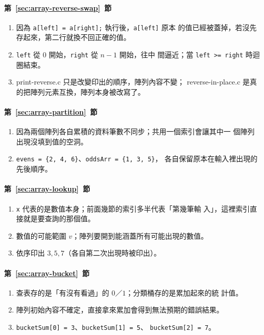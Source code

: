 \paragraph{第~\ref{sec:array-reverse-swap}~節}
\begin{enumerate}
\item 因為 \texttt{a[left] = a[right];} 執行後，\texttt{a[left]} 原本
的值已經被蓋掉，若沒先存起來，第二行就換不回正確的值。
\item \texttt{left} 從 $0$ 開始，\texttt{right} 從 $n - 1$ 開始，往中
間逼近；當 \texttt{left >= right} 時迴圈結束。
\item print-reverse.c 只是改變印出的順序，陣列內容不變；
reverse-in-place.c 是真的把陣列元素互換，陣列本身被改寫了。
\end{enumerate}

\paragraph{第~\ref{sec:array-partition}~節}
\begin{enumerate}
\item 因為兩個陣列各自累積的資料筆數不同步；共用一個索引會讓其中一
個陣列出現沒填到值的空洞。
\item \texttt{evens = \{2, 4, 6\}}、\texttt{oddsArr = \{1, 3, 5\}}，
各自保留原本在輸入裡出現的先後順序。
\end{enumerate}

\paragraph{第~\ref{sec:array-lookup}~節}
\begin{enumerate}
\item \texttt{x} 代表的是數值本身；前面幾節的索引多半代表「第幾筆輸
入」，這裡索引直接就是要查詢的那個值。
\item 數值的可能範圍 $v$；陣列要開到能涵蓋所有可能出現的數值。
\item 依序印出 $3, 5, 7$（各自第二次出現時被印出）。
\end{enumerate}

\paragraph{第~\ref{sec:array-bucket}~節}
\begin{enumerate}
\item 查表存的是「有沒有看過」的 $0$／$1$；分類桶存的是累加起來的統
計值。
\item 陣列初始內容不確定，直接拿來累加會得到無法預期的錯誤結果。
\item \texttt{bucketSum[0] = 3}、\texttt{bucketSum[1] = 5}、
\texttt{bucketSum[2] = 7}。
\end{enumerate}


